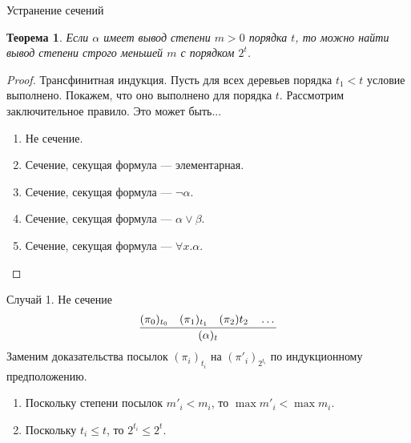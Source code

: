 \documentclass[handout]{beamer}
\newtheorem{thm}{Теорема}[section]
\begin{document}
\begin{frame}{Устранение сечений}
\begin{thm}Если $\alpha$ имеет вывод степени $m>0$ порядка $t$, то
можно найти вывод степени строго меньшей $m$ с порядком $2^t$.
\end{thm}

\begin{proof}Трансфинитная индукция. Пусть для всех деревьев порядка $t_1 < t$ 
условие выполнено. Покажем, что оно выполнено для порядка $t$.
Рассмотрим заключительное правило. Это может быть...

\begin{enumerate}
\item Не сечение.
\item Сечение, секущая формула --- элементарная.
\item Сечение, секущая формула --- $\neg\alpha$.
\item Сечение, секущая формула --- $\alpha\vee\beta$.
\item Сечение, секущая формула --- $\forall x.\alpha$.
\end{enumerate}
\end{proof}
\end{frame}

\begin{frame}{Случай 1. Не сечение}
$$\infer{(\alpha)_{t}}{(\pi_0)_{t_0}\quad(\pi_1)_{t_1}\quad(\pi_2){t_2}\quad\dots}$$
Заменим доказательства посылок $(\pi_i)_{t_i}$ на $(\pi'_i)_{2^{t_i}}$ по индукционному предположению.

\begin{enumerate}
\item Поскольку степени посылок $m'_i < m_i$, то $\max m'_i < \max m_i$.
\item Поскольку $t_i \le t$, то $2^{t_i} \le 2^t$.
\end{enumerate}
\end{frame}
\end{document}
